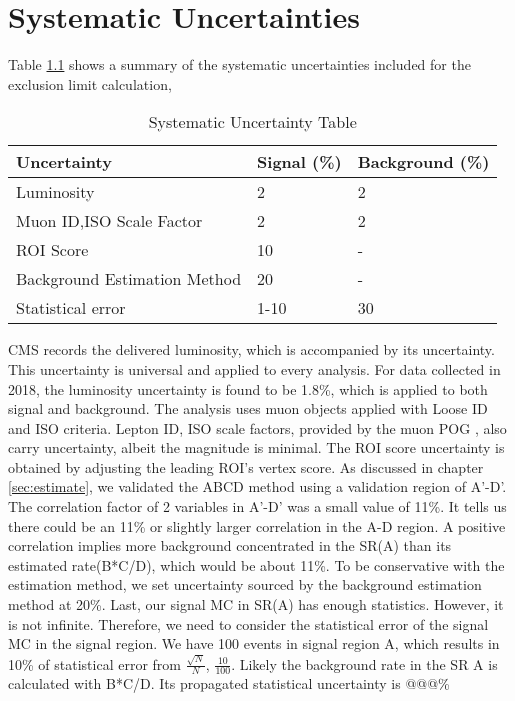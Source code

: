 \clearpage
\chapter{Systematic Uncertainties}\label{sec:systs}
Table \ref{tab:systab} shows a summary of the systematic uncertainties included for the exclusion limit calculation,

\begin{table}[htb!]
  \caption{Systematic Uncertainty Table}
  \begin{center}
    \begin{tabular}{l|l|l}\hline
     Uncertainty    & Signal (\%) & Background (\%)\\
      \hline
     Luminosity     & 2 & 2\\
      \hline
     Muon ID,ISO Scale Factor     & 2 & 2 \\
      \hline
     ROI Score      & 10 & -\\
      \hline
     Background Estimation Method     & 20 & - \\
      \hline
     Statistical error     & 1-10 & 30 \\
      \hline
    \end{tabular}
    \label{tab:systab}
  \end{center}
\end{table}
CMS records the delivered luminosity, which is accompanied by its uncertainty.
This uncertainty is universal and applied to every analysis.
For data collected in 2018, the luminosity uncertainty is found to be 1.8\%, which is applied to both signal and background.
The analysis uses muon objects applied with Loose ID and ISO criteria.
Lepton ID, ISO scale factors, provided by the muon POG \cite{muonpog}, also carry uncertainty, albeit the magnitude is minimal.
The ROI score uncertainty is obtained by adjusting the leading ROI's vertex score.
As discussed in chapter \ref{sec:estimate}, we validated the ABCD method using a validation region of A'-D'.
The correlation factor of 2 variables in A'-D' was a small value of 11\%.
It tells us there could be an 11\% or slightly larger correlation in the A-D region.
A positive correlation implies more background concentrated in the SR(A) than its estimated rate(B*C/D), which would be about 11\%.
To be conservative with the estimation method, we set uncertainty sourced by the background estimation method at 20\%.
Last, our signal MC in SR(A) has enough statistics.
However, it is not infinite.
Therefore, we need to consider the statistical error of the signal MC in the signal region.
We have 100 events in signal region A, which results in 10\% of statistical error from $\frac{\sqrt{N}}{N}$, $\frac{10}{100}$.
Likely the background rate in the SR A is calculated with B*C/D.
Its propagated statistical uncertainty is @@@\%
